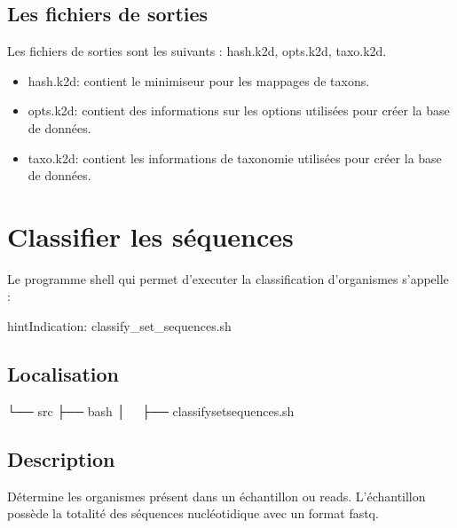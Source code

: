 \documentclass[letterpaper,10pt,french]{sphinxmanual}
\begin{document}
\subsection{Les fichiers de sorties}
\label{\detokenize{bash/create_kraken_database.sh:les-fichiers-de-sorties}}
Les fichiers de sorties sont les suivants : hash.k2d, opts.k2d, taxo.k2d.
\begin{itemize}
\item {} 
hash.k2d: contient le minimiseur pour les mappages de taxons.

\item {} 
opts.k2d: contient des informations sur les options utilisées pour créer la base de données.

\item {} 
taxo.k2d: contient les informations de taxonomie utilisées pour créer la base de données.

\end{itemize}


\section{Classifier les séquences}
\label{\detokenize{bash/classify_set_sequences.sh:classifier-les-sequences}}\label{\detokenize{bash/classify_set_sequences.sh::doc}}
Le programme shell qui permet d’executer la classification d’organismes s’appelle :

\begin{sphinxadmonition}{hint}{Indication:}
classify\_set\_sequences.sh
\end{sphinxadmonition}


\subsection{Localisation}
\label{\detokenize{bash/classify_set_sequences.sh:localisation}}
\begin{sphinxVerbatim}[commandchars=\\\{\}]
└── src
 ├── bash
 │   ├── classify\PYGZus{}set\PYGZus{}sequences.sh
\end{sphinxVerbatim}


\subsection{Description}
\label{\detokenize{bash/classify_set_sequences.sh:description}}
Détermine les organismes présent dans un échantillon ou reads. L’échantillon possède la totalité des séquences nucléotidique avec un format fastq.
\end{document}

